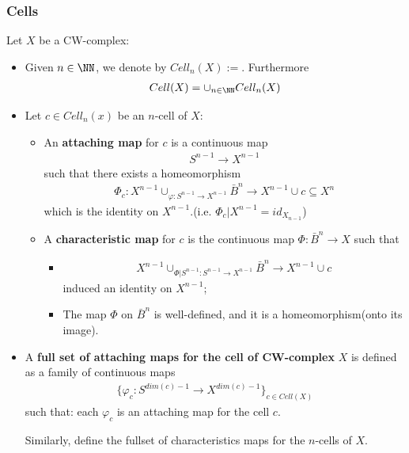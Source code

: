 \documentclass[Total.tex]{subfiles}
\begin{document}
	\subsubsection{Cells}
	\begin{Def}
		Let $X$ be a CW-complex:
		\begin{itemize}
			\item Given $n\in \NN$, we denote by $Cell_n(X):=$. Furthermore
			\begin{gather*}
				Cell(X)=\cup_{n\in \NN} Cell_n(X)
			\end{gather*}
			\item Let $c\in Cell_n(x)$ be an $n$-cell of $X$:
			\begin{itemize}
				\item An \textbf{attaching map} for $c$ is a continuous map
				\begin{gather*}
					S^{n-1}\rightarrow X^{n-1}
				\end{gather*}
				such that there exists a homeomorphism
				\begin{gather*}
					\Phi_c:X^{n-1}\cup_{\varphi:S^{n-1}\rightarrow X^{n-1}} \bar{B}^{n}\rightarrow X^{n-1}\cup c\subseteq X^n
				\end{gather*}
				which is the identity on $X^{n-1}$.(i.e. $\Phi_c|X^{n-1}=id_{X_{n-1}}$)
				\item A \textbf{characteristic map} for $c$ is the continuous map $\Phi:\bar{B}^n\rightarrow X$ such that
				\begin{itemize}
					\item \begin{gather*}
						X^{n-1}\cup_{\Phi|S^{n-1}:S^{n-1}\rightarrow X^{n-1}} \bar{B}^n\rightarrow X^{n-1}\cup c
					\end{gather*}
					induced an identity on $X^{n-1}$;
					\item The map $\Phi$ on $\bar{{B}}^n$ is well-defined, and it is a homeomorphism(onto its image).
				\end{itemize}
			\end{itemize}
			\item A \textbf{full set of attaching maps for the cell of CW-complex} $X$ is defined as a family of continuous maps
			\begin{gather*}
				\{\varphi_c:S^{dim(c)-1}\rightarrow X^{dim(c)-1}\}_{c\in Cell(X)}
			\end{gather*}
			such that: each $\varphi_c$ is an attaching map for the cell $c$. 
			
			Similarly, define the fullset of characteristics maps for the $n$-cells of $X$.
		\end{itemize}
	\end{Def}
\end{document}
